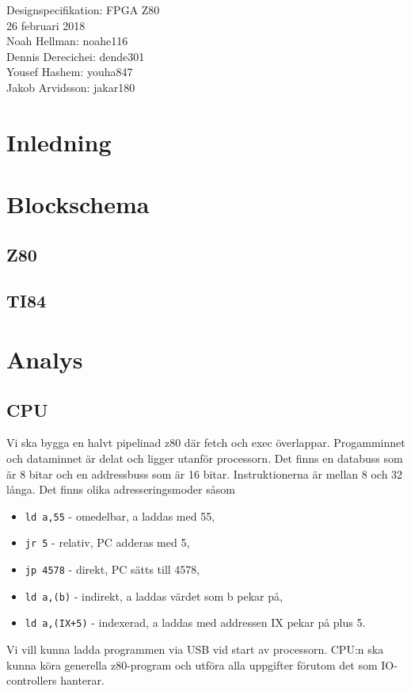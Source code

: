 \documentclass[12pt]{article}
\begin{document}
\begin{center}
\vspace*{2cm}
{\Huge Designspecifikation: FPGA Z80}\\
\vspace{2cm}
{\large 26 februari 2018}\\
\vspace{2cm}
Noah Hellman: noahe116 \\
Dennis Derecichei: dende301 \\
Yousef Hashem: youha847 \\
Jakob Arvidsson: jakar180 \\
\end{center}

\vspace{2cm}
\tableofcontents
\newpage

\section{Inledning}
\section{Blockschema}
\subsection{Z80}
\subsection{TI84}
\section{Analys}
\subsection{CPU}
Vi ska bygga en halvt pipelinad z80 där fetch och exec överlappar. Progamminnet
och dataminnet är delat och ligger utanför processorn. Det finns en databuss
som är 8 bitar och en addressbuss som är 16 bitar. Instruktionerna är mellan 8
och 32 långa. Det finns olika adresseringsmoder såsom
\begin{itemize}
    \item \texttt{ld a,55} - omedelbar, a laddas med 55,
    \item \texttt{jr 5} - relativ, PC adderas med 5,
    \item \texttt{jp 4578} - direkt, PC sätts till 4578,
    \item \texttt{ld a,(b)} - indirekt, a laddas värdet som b pekar på,
    \item \texttt{ld a,(IX+5)} - indexerad, a laddas med addressen IX pekar på
        plus 5.
\end{itemize}
Vi vill kunna ladda programmen via USB vid start av processorn. CPU:n ska kunna
köra generella z80-program och utföra alla uppgifter förutom det som
IO-controllers hanterar.
\end{document}
